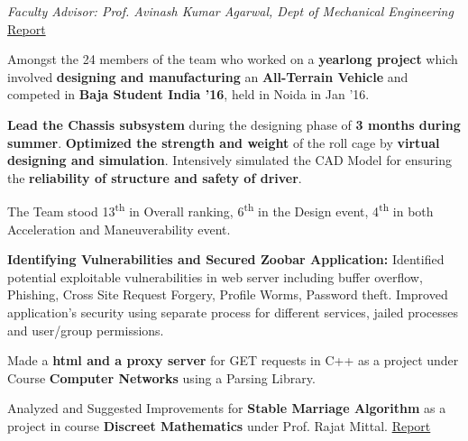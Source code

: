 \documentclass[a4paper]{norm-resume}
\begin{document}
    	
    \emph{Faculty Advisor: Prof. Avinash Kumar Agarwal, Dept of Mechanical Engineering} \hfill \small \href{https://ayush-tulsyan.github.io/files/projects/B16ChassisDesignReport.pdf}{Report}
    \vspace{3mm}
    \begin{tightitemize}
    \small
    {
    \item Amongst the 24 members of the team who worked on a \textbf{yearlong project} which involved \textbf{designing and manufacturing} an \textbf{All-Terrain Vehicle} and competed in \textbf{Baja Student India ’16}, held in Noida in Jan ’16.
    \item \textbf{Lead the Chassis subsystem} during the designing phase of \textbf{3 months during summer}. \textbf{Optimized the strength and weight} of the roll cage by \textbf{virtual designing and simulation}. Intensively simulated the CAD Model for ensuring the \textbf{reliability of structure and safety of driver}.
    }
    \item The Team stood 13\textsuperscript{th} in Overall ranking, 6\textsuperscript{th} in the Design event, 4\textsuperscript{th} in both Acceleration and Maneuverability event.
    \end{tightitemize}

    \vspace{5mm}


    \vspace{3mm}
    \begin{tightitemize}
    \small
    {
    \item \textbf{Identifying Vulnerabilities and Secured Zoobar Application:} Identified potential exploitable vulnerabilities in web server including buffer overflow, Phishing, Cross Site Request Forgery, Profile Worms, Password theft. Improved application's security using separate process for different services, jailed processes and user/group permissions.
    \item Made a \textbf{html and a proxy server} for GET requests in C++ as a project under Course \textbf{Computer Networks} using a Parsing Library.
    \item Analyzed and Suggested Improvements for \textbf{Stable Marriage Algorithm} as a project in course \textbf{Discreet Mathematics} under Prof. Rajat Mittal. \hfill \href{https://ayush-tulsyan.github.io/files/projects/CS201ProjectReport.pdf}{Report}
    }
    \end{tightitemize}
\end{document}
